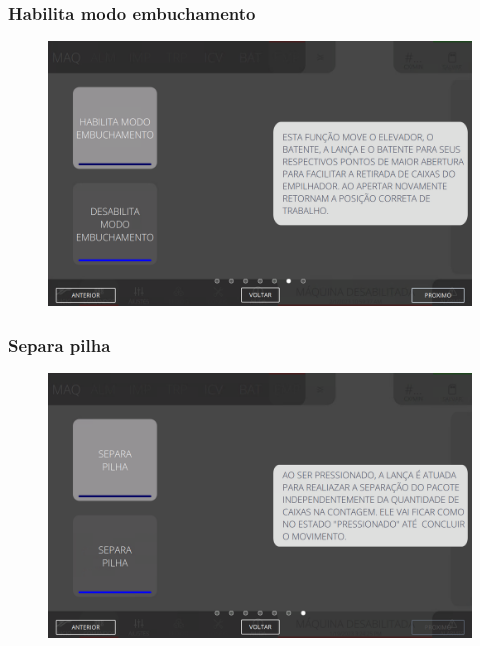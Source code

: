 \newpage
\thispagestyle{fancy}
\vspace*{40 pt}
\subsubsection{\small{Habilita modo embuchamento}} \label{sec:telaComandosEmpilhadorHabilitaModoEmbuchamento}
\vspace*{\fill}
\begin{figure}[h]
    \centering
    \includegraphics[width=576 px,height=360 px]{src/imagesICV/08-stacker/commands/e-11.png}
\end{figure}
\vspace*{\fill}

\newpage
\thispagestyle{fancy}
\vspace*{40 pt}
\subsubsection{\small{Separa pilha}} \label{sec:telaComandosEmpilhadorSeparaPilha}
\vspace*{\fill}
\begin{figure}[h]
    \centering
    \includegraphics[width=576 px,height=360 px]{src/imagesICV/08-stacker/commands/e-12.png}
\end{figure}
\vspace*{\fill}

